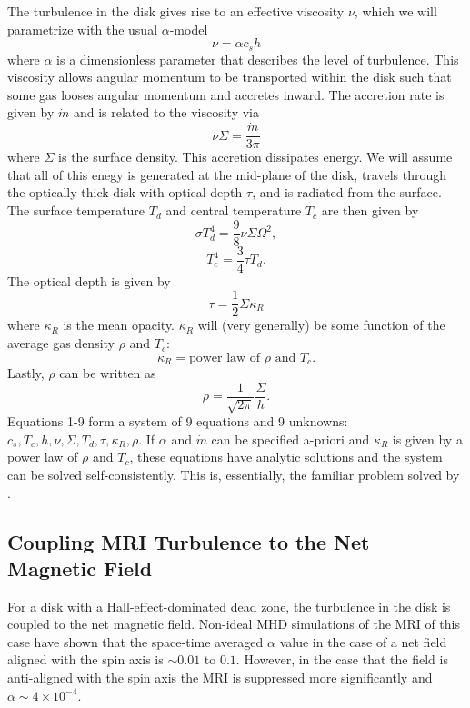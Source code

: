 The turbulence in the disk gives rise to an effective viscosity $\nu$, which we will parametrize with the usual $\alpha$-model 
\begin{equation} 
\nu          = \alpha c_s h                    
\end{equation}
where $\alpha$ is a dimensionless parameter that describes the level of turbulence.  This viscosity allows angular momentum to be transported within the disk such that some gas looses angular momentum and accretes inward.  The accretion rate is given by $\dot{m}$ and is related to the viscosity via
\begin{equation} 
\nu \Sigma   = \frac{\dot{m}}{3\pi}
\end{equation}
where $\Sigma$ is the surface density. This accretion dissipates energy.  We will assume that all of this enegy is generated at the mid-plane of the disk, travels through the optically thick disk with optical depth $\tau$, and is radiated from the surface.  The surface temperature $T_d$ and central temperature $T_c$ are then given by
\begin{equation} 
\sigma T_d^4 = \frac{9}{8} \nu \Sigma \Omega^2,
\end{equation} 
\begin{equation} 
T_c^4        = \frac{3}{4} \tau T_{d}. 
\end{equation} 
The optical depth is given by 
\begin{equation} 
\tau         = \frac{1}{2} \Sigma \kappa_R     
\end{equation} 
where $\kappa_R$ is the mean opacity.  $\kappa_R$ will (very generally) be some function of the average gas density $\rho$ and $T_c$:
\begin{equation} 
\kappa_R = \text{power law of } \rho \text{ and } T_c.
\end{equation}
Lastly, $\rho$ can be written as
\begin{equation} 
\rho         = \frac{1}{\sqrt{2\pi}} \frac{\Sigma}{h}.
\end{equation}
Equations 1-9 form a system of 9 equations and 9 unknowns: $c_s, T_c, h, \nu, \Sigma, T_d, \tau, \kappa_R, \rho$.  If $\alpha$ and $\dot{m}$ can be specified a-priori and $\kappa_R$ is given by a power law of $\rho$ and $T_c$, these equations have analytic solutions and the system can be solved self-consistently.  This is, essentially, the familiar problem solved by \cite{shakura73}.  


\subsection{Coupling MRI Turbulence to the Net Magnetic Field } 
For a disk with a Hall-effect-dominated dead zone, the turbulence in the disk is coupled to the net magnetic field.  Non-ideal MHD simulations of the MRI of this case have shown that the space-time averaged $\alpha$ value in the case of a net field aligned with the spin axis is $\sim 0.01$ to $0.1$.  However, in the case that the field is anti-aligned with the spin axis the MRI is suppressed more significantly and $\alpha \sim 4 \times 10^{-4}$.  

